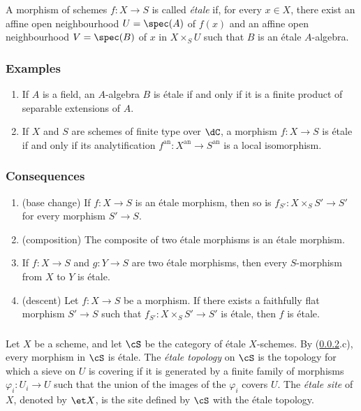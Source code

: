 A morphism of schemes $f:X\to S$ is called \emph{étale} if, for every
$x\in X$, there exist an affine open neighbourhood $U=\spec(A)$ of
$f(x)$ and an affine open neighbourhood $V=\spec(B)$ of $x$ in
$X\times_SU$ such that $B$ is an étale $A$-algebra.

\subsubsection{Examples}\label{I:2-1-2}
\begin{enumerate}[\indent a)]
  \item If $A$ is a field, an $A$-algebra $B$ is étale if and only if it
    is a finite product of separable extensions of $A$.
  \item If $X$ and $S$ are schemes of finite type over $\dC$, a morphism
    $f:X\to S$ is étale if and only if its analytification
    $f^{\text{an}}:X^{\text{an}}\to S^{\text{an}}$ is a local
    isomorphism.
\end{enumerate}

\subsubsection{Consequences}\label{I:2-1-3}
\begin{enumerate}[\indent a)]
  \item (base change) If $f:X\to S$ is an étale morphism, then so is
    $f_{S'}:X\times_SS'\to S'$ for every morphism $S'\to S$.
  \item (composition) The composite of two étale morphisms is an étale morphism.
  \item If $f:X\to S$ and $g:Y\to S$ are two étale morphisms, then every
    $S$-morphism from $X$ to $Y$ is étale.
  \item (descent) Let $f:X\to S$ be a morphism. If there exists a
    faithfully flat morphism $S'\to S$ such that
    $f_{S'}:X\times_SS'\to S'$ is étale, then $f$ is étale.
\end{enumerate}

\subsubsection{}\label{I:2-1-4}

Let $X$ be a scheme, and let $\cS$ be the category of étale
$X$-schemes. By (\ref{I:2-1-3}.c), every morphism in $\cS$ is étale.
The \emph{étale topology} on $\cS$ is the topology for which a sieve on
$U$ is covering if it is generated by a finite family of morphisms
$\varphi_i:U_i\to U$ such that the union of the images of the
$\varphi_i$ covers $U$. The \emph{étale site} of $X$, denoted by
$\et X$, is the site defined by $\cS$ with the étale topology.

